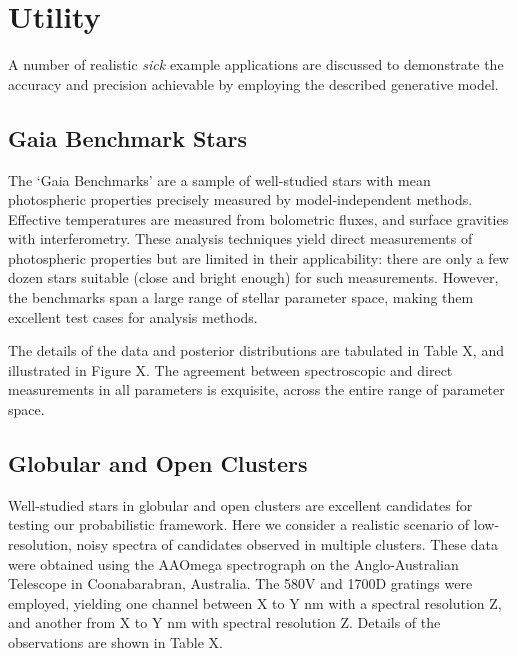 \documentclass{aastex}
\newcommand{\sick}{\textit{sick}}
\begin{document}


\section{Utility}
A number of realistic \sick{} example applications are discussed to demonstrate the accuracy and precision achievable by employing the described generative model.

\subsection{Gaia Benchmark Stars}
The `Gaia Benchmarks' are a sample of well-studied stars with mean photospheric properties precisely measured by model-independent methods. Effective temperatures are measured from bolometric fluxes, and surface gravities with interferometry. These analysis techniques yield direct measurements of photospheric properties but are limited in their applicability: there are only a few dozen stars suitable (close and bright enough) for such measurements. However, the benchmarks span a large range of stellar parameter space, making them excellent test cases for analysis methods.



The details of the data and posterior distributions are tabulated in Table X, and illustrated in Figure X. The agreement between spectroscopic and direct measurements in all parameters is exquisite, across the entire range of parameter space.  



\subsection{Globular and Open Clusters}
Well-studied stars in globular and open clusters are excellent candidates for testing our probabilistic framework. Here we consider a realistic scenario of low-resolution, noisy spectra of candidates observed in multiple clusters. These data were obtained using the AAOmega spectrograph on the Anglo-Australian Telescope in Coonabarabran, Australia. The 580V and 1700D gratings were employed, yielding one channel between X to Y nm with a spectral resolution Z, and another from X to Y nm with spectral resolution Z. Details of the observations are shown in Table X.
\end{document}
